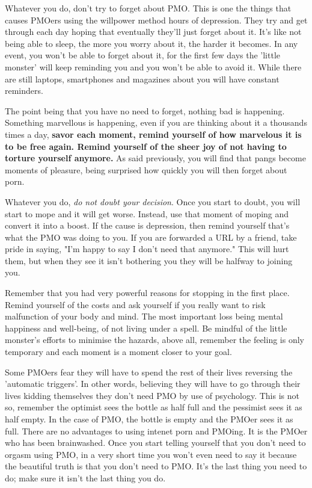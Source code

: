 Whatever you do, don't try to forget about PMO. This is one the things that causes PMOers using the willpower method hours of depression. They try and get through each day hoping that eventually they'll just forget about it. It's like not being able to sleep, the more you worry about it, the harder it becomes. In any event, you won't be able to forget about it, for the first few days the 'little monster' will keep reminding you and you won't be able to avoid it. While there are still laptops, smartphones and magazines about you will have constant reminders.

The point being that you have no need to forget, nothing bad is happening. Something marvellous is happening, even if you are thinking about it a thousands times a day, \textbf{savor each moment, remind yourself of how marvelous it is to be free again. Remind yourself of the sheer joy of not having to torture yourself anymore.} As said previously, you will find that pangs become moments of pleasure, being surprised how quickly you will then forget about porn.

Whatever you do, \textit{do not doubt your decision}. Once you start to doubt, you will start to mope and it will get worse. Instead, use that moment of moping and convert it into a boost. If the cause is depression, then remind yourself that's what the PMO was doing to you. If you are forwarded a URL by a friend, take pride in saying, "I'm happy to say I don't need that anymore." This will hurt them, but when they see it isn't bothering you they will be halfway to joining you.

Remember that you had very powerful reasons for stopping in the first place. Remind yourself of the costs and ask yourself if you really want to risk malfunction of your body and mind. The most important loss being mental happiness and well-being, of not living under a spell. Be mindful of the little monster's efforts to minimise the hazards, above all, remember the feeling is only temporary and each moment is a moment closer to your goal.

Some PMOers fear they will have to spend the rest of their lives reversing the 'automatic triggers'. In other words, believing they will have to go through their lives kidding themselves they don't need PMO by use of psychology. This is not so, remember the optimist sees the bottle as half full and the pessimist sees it as half empty. In the case of PMO, the bottle is empty and the PMOer sees it as full. There are no advantages to using intenet porn and PMOing. It is the PMOer who has been brainwashed. Once you start telling yourself that you don't need to orgasm using PMO, in a very short time you won't even need to say it because the beautiful truth is that you don't need to PMO. It's the last thing you need to do; make sure it isn't the last thing you do.
